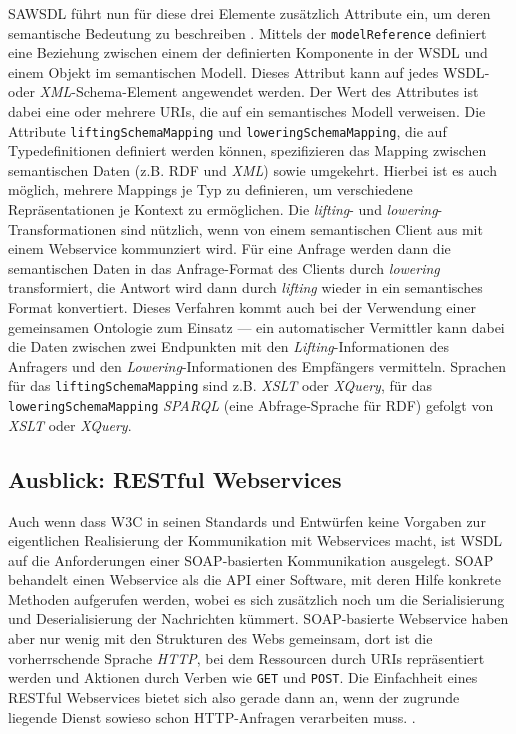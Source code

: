 \ac{SAWSDL} führt nun für diese drei Elemente zusätzlich Attribute ein, um deren semantische Bedeutung zu beschreiben \cite[S.62ff]{ky-sawsdl}. Mittels der 
\texttt{modelReference} definiert eine Beziehung zwischen einem der definierten Komponente in der \ac{WSDL} und einem Objekt im semantischen Modell. Dieses Attribut kann auf jedes \ac{WSDL}- oder \emph{XML}-Schema-Element angewendet werden. Der Wert des Attributes ist dabei eine oder mehrere URIs, die auf ein semantisches Modell verweisen. Die Attribute \texttt{liftingSchemaMapping} und \texttt{loweringSchemaMapping}, die auf Typedefinitionen definiert werden können, spezifizieren das Mapping zwischen semantischen Daten (z.B. \ac{RDF} und \emph{XML}) sowie umgekehrt. Hierbei ist es auch möglich, mehrere Mappings je Typ zu definieren, um verschiedene Repräsentationen je Kontext zu ermöglichen. Die \emph{lifting}- und \emph{lowering}-Transformationen sind nützlich, wenn von einem semantischen Client aus mit einem Webservice kommunziert wird. Für eine Anfrage werden dann die semantischen Daten in das Anfrage-Format des Clients durch \emph{lowering} transformiert, die Antwort wird dann durch \emph{lifting} wieder in ein semantisches Format konvertiert. Dieses Verfahren kommt auch bei der Verwendung einer gemeinsamen Ontologie zum Einsatz --- ein automatischer Vermittler kann dabei die Daten zwischen zwei Endpunkten mit den \emph{Lifting}-Informationen des Anfragers und den \emph{Lowering}-Informationen des Empfängers vermitteln. Sprachen für das \texttt{liftingSchemaMapping} sind z.B. \emph{XSLT} oder \emph{XQuery}, für das \texttt{loweringSchemaMapping} \emph{SPARQL} (eine Abfrage-Sprache für \ac{RDF}) gefolgt von \emph{XSLT} oder \emph{XQuery}.

\subsection*{Ausblick: RESTful Webservices}

Auch wenn dass \ac{W3C} in seinen Standards und Entwürfen keine Vorgaben zur eigentlichen Realisierung der Kommunikation mit Webservices macht, ist  \ac{WSDL} auf die Anforderungen einer \ac{SOAP}-basierten Kommunikation ausgelegt. \ac{SOAP} behandelt einen Webservice als die API einer Software, mit deren Hilfe konkrete Methoden aufgerufen werden, wobei es sich zusätzlich noch um die Serialisierung und Deserialisierung der Nachrichten kümmert. \ac{SOAP}-basierte Webservice haben aber nur wenig mit den Strukturen des Webs gemeinsam, dort ist die vorherrschende Sprache \emph{HTTP}, bei dem Ressourcen durch URIs repräsentiert werden und Aktionen durch Verben wie \texttt{GET} und \texttt{POST}. Die Einfachheit eines RESTful Webservices bietet sich also gerade dann an, wenn der zugrunde liegende Dienst sowieso schon HTTP-Anfragen verarbeiten muss. \cite[S.18]{xn-sss}.

